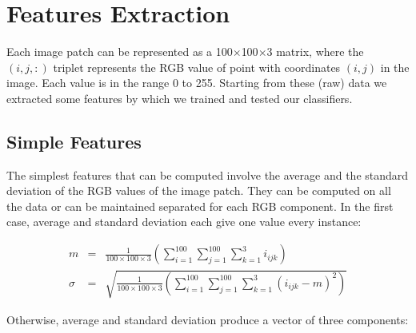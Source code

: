 \vspace{0.5cm}




\section{Features Extraction}

Each image patch can be represented as a 100$\times$100$\times$3 matrix, where the $(i,j,:)$ triplet represents the RGB value of point with coordinates $(i,j)$ in the image.
Each value is in the range 0 to 255. Starting from these (raw) data we extracted some features by which we trained and tested our classifiers.

\vspace{0.5cm}

\subsection{Simple Features}

The simplest features that can be computed involve the average and the standard deviation of the RGB values of the image patch. They can be computed on all the data or can be maintained separated
for each RGB component. In the first case, average and standard deviation each give one value every instance:

\begin{eqnarray}
 m & = & \frac{1}{100\times100\times3} \left( \sum_{i=1}^{100} \sum_{j=1}^{100} \sum_{k=1}^{3} i_{ijk} \right) \\
 \sigma & = & \sqrt{\frac{1}{100\times100\times3} \left( \sum_{i=1}^{100} \sum_{j=1}^{100} \sum_{k=1}^{3} (i_{ijk} - m )^2 \right)}
\end{eqnarray}

Otherwise, average and standard deviation produce a vector of three components:


